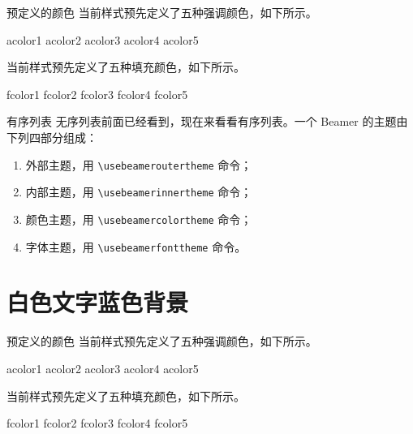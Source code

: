 \documentclass[14pt,notheorems,xcolor={rgb}]{beamer}
\begin{document}
\begin{frame}{预定义的颜色}
当前样式预先定义了五种强调颜色，如下所示。
\begin{flushleft}
\textcolor{acolor1}{acolor1}
\textcolor{acolor2}{acolor2}
\textcolor{acolor3}{acolor3}
\textcolor{acolor4}{acolor4}
\textcolor{acolor5}{acolor5}
\end{flushleft}
当前样式预先定义了五种填充颜色，如下所示。
\begin{flushleft}
\colorbox{fcolor1}{fcolor1}
\colorbox{fcolor2}{fcolor2}
\colorbox{fcolor3}{fcolor3}
\colorbox{fcolor4}{fcolor4}
\colorbox{fcolor5}{fcolor5}
\end{flushleft}
\end{frame}

\begin{frame}[fragile]{有序列表}
无序列表前面已经看到，现在来看看有序列表。一个 Beamer 的主题由下列四部分组成：\pause
\begin{enumerate}[<+->]
\item 外部主题，用 \verb!\usebeameroutertheme! 命令；
\item 内部主题，用 \verb!\usebeamerinnertheme! 命令；
\item 颜色主题，用 \verb!\usebeamercolortheme! 命令；
\item 字体主题，用 \verb!\usebeamerfonttheme! 命令。
\end{enumerate}
\end{frame}


\begin{frame}[plain]\transboxout
\titlepage
\end{frame}

\section{白色文字蓝色背景}

\begin{frame}{预定义的颜色}
当前样式预先定义了五种强调颜色，如下所示。
\begin{flushleft}
\textcolor{acolor1}{acolor1}
\textcolor{acolor2}{acolor2}
\textcolor{acolor3}{acolor3}
\textcolor{acolor4}{acolor4}
\textcolor{acolor5}{acolor5}
\end{flushleft}
当前样式预先定义了五种填充颜色，如下所示。
\begin{flushleft}
\colorbox{fcolor1}{fcolor1}
\colorbox{fcolor2}{fcolor2}
\colorbox{fcolor3}{fcolor3}
\colorbox{fcolor4}{fcolor4}
\colorbox{fcolor5}{fcolor5}
\end{flushleft}
\end{frame}
\end{document}

